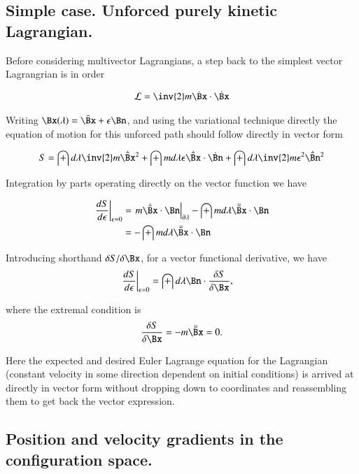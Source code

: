 \documentclass{article}
\newcommand{\LL}[0]{\mathcal{L}}
\begin{document}
\subsection{ Simple case.  Unforced purely kinetic Lagrangian. }

Before considering multivector Lagrangians, a step back to the simplest vector Lagrangrian is in order

\begin{align*}
\LL = \inv{2}m \dot{\Bx} \cdot \dot{\Bx}
\end{align*}

Writing $\Bx(\lambda) = \bar{\Bx} + \epsilon \Bn$, and using the variational technique directly the equation of motion for this unforced path should follow directly
in vector form

\begin{align*}
S = \int d\lambda \inv{2} m \dot{\bar{\Bx}}^2 + \int m d\lambda \epsilon \dot{\bar{\Bx}} \cdot \dot{\Bn} + \int d\lambda \inv{2} m \epsilon^2 \dot{\bar{\Bn}}^2
\end{align*}

Integration by parts operating directly on the vector function we have

\begin{align*}
\left.\frac{d S}{d\epsilon}\right\vert_{\epsilon=0} 
&= \left.{m \dot{\bar{\Bx}} \cdot {\Bn}}\right\vert_{\partial \lambda} - \int m d\lambda \ddot{\bar{\Bx}} \cdot {\Bn} \\
&= - \int m d\lambda \ddot{\bar{\Bx}} \cdot {\Bn} \\
\end{align*}

Introducing shorthand $\delta S/\delta \Bx$, for a vector functional derivative, we have
\begin{align*}
\left.\frac{d S}{d\epsilon}\right\vert_{\epsilon=0} &= \int d\lambda \Bn \cdot \frac{\delta S}{\delta \Bx},
\end{align*}

where the extremal condition is
\begin{align*}
\frac{\delta S}{\delta \Bx} = - m \ddot{\bar{\Bx}} = 0.
\end{align*}

Here the expected and desired Euler Lagrange equation for the Lagrangian (constant velocity in some direction dependent on initial conditions) is arrived at directly in vector form without dropping down to coordinates and reassembling them to get back the vector expression.

\subsection{ Position and velocity gradients in the configuration space. }
\end{document}
